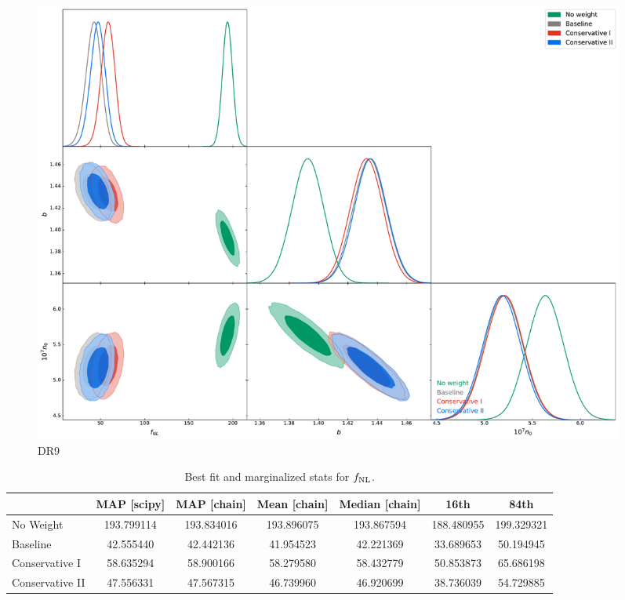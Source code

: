 \begin{figure}
    \centering
    \includegraphics[width=0.95\textwidth]{figures/mcmc_dr9.pdf} 
    \caption{DR9}\label{fig:mcmc_dr9}
\end{figure}

\begin{table}
  \begin{center}
    \caption{Best fit and marginalized  stats for $f_{\rm NL}$.}
    \label{tab:mocksmcmc}
    \begin{tabular}{lcccccc}
    \hline
    \hline
    & MAP [scipy] & MAP [chain]  &	Mean [chain]	& Median [chain] &	16th	& 84th \\
    \hline
No Weight	 & 193.799114 &	193.834016	& 193.896075 &	193.867594&	188.480955&	199.329321 \\
Baseline&	42.555440&	42.442136&	41.954523&	42.221369&	33.689653&	50.194945\\
Conservative I &	58.635294 &	58.900166&	58.279580&	58.432779&	50.853873&	65.686198 \\
Conservative II	& 47.556331 &	47.567315 &	46.739960 &	46.920699 &	38.736039 &	54.729885 
    \end{tabular}
  \end{center}
\end{table}

%	

